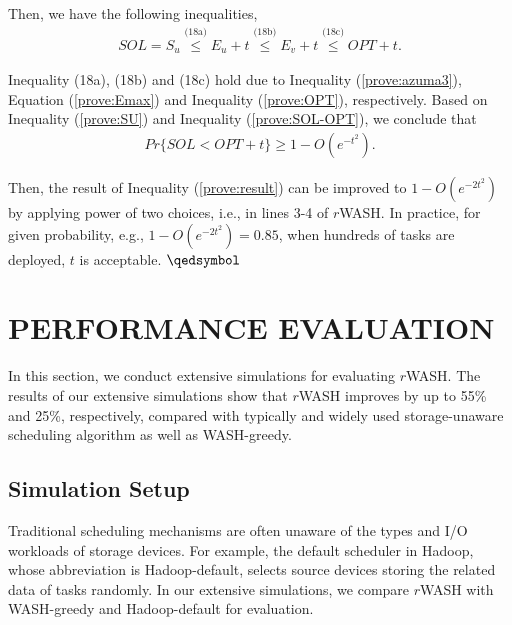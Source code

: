 \documentclass[conference]{IEEEtran}
\begin{document}
\vspace{-0.2cm}
Then, we have the following inequalities,
\vspace{-0.2cm}
\begin{align}
SOL = S_u  
\overset{\text{(18a)}}{\leq} E_u+t
\overset{\text{(18b)}}{\leq} E_v+t
\overset{\text{(18c)}}{\leq} OPT+t.\label{prove:SOL-OPT}
\end{align}

Inequality (18a), (18b) and (18c) hold due to Inequality (\ref{prove:azuma3}), Equation (\ref{prove:Emax}) and Inequality (\ref{prove:OPT}), respectively.  Based on Inequality (\ref{prove:SU}) and Inequality (\ref{prove:SOL-OPT}), we conclude that
\vspace{-0.1cm}
\begin{align}
Pr\{SOL<OPT+t\}\geq 1 - O(e^{-t^2}).\label{prove:result}
\end{align}

\vspace{-0.2cm}

Then, the result of Inequality (\ref{prove:result}) can be improved to $1 - O(e^{-2t^2})$ by applying power of two choices, i.e., in lines 3-4 of $r$WASH. In practice, for given probability, e.g., $1 - O(e^{-2t^2}) = 0.85$, when hundreds of tasks are deployed, $t$ is acceptable. \hfill \;$\qedsymbol$

\section{PERFORMANCE EVALUATION}\label{PERFORMANCE_EVALUATION}
In this section, we conduct extensive simulations for evaluating $r$WASH. The results of our extensive simulations show that $r$WASH improves by up to 55\% and 25\%, respectively, compared with typically and widely used storage-unaware scheduling algorithm as well as WASH-greedy.

\subsection{Simulation Setup}\label{SCM}
Traditional scheduling mechanisms are often unaware of the types and I/O workloads of storage devices. For example, the default scheduler in Hadoop, whose abbreviation is Hadoop-default, selects source devices storing the related data of tasks randomly. In our extensive simulations, we compare $r$WASH with WASH-greedy and Hadoop-default for evaluation.
\end{document}

